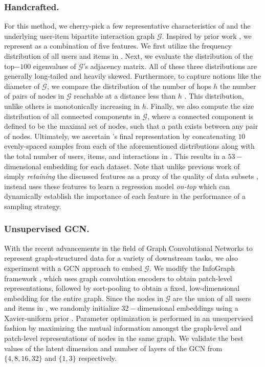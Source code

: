 \subsubsection{Handcrafted. \ \ } For this method, we cherry-pick a few representative characteristics of \dataset and the underlying user-item bipartite interaction graph $\mathcal{G}$. Inspired by prior work \cite{large_graphs}, we represent \dataset as a combination of five features. We first utilize the frequency distribution of all users and items in \dataset. Next, we evaluate the distribution of the top$-100$ eigenvalues of $\mathcal{G}$'s adjacency matrix. All of these three distributions are generally long-tailed and heavily skewed. Furthermore, to capture notions like the diameter of $\mathcal{G}$, we compare the distribution of the number of hops $h$ \vs the number of pairs of nodes in $\mathcal{G}$ reachable at a distance less than $h$ \cite{hop_plot}. This distribution, unlike others is monotonically increasing in $h$. Finally, we also compute the size distribution of all connected components in $\mathcal{G}$, where a connected component is defined to be the maximal set of nodes, such that a path exists between any pair of nodes. Ultimately, we ascertain \dataset's final representation by concatenating $10$ evenly-spaced samples from each of the aforementioned distributions along with the total number of users, items, and interactions in \dataset. This results in a $53-$dimensional embedding for each dataset. Note that unlike previous work of simply \emph{retaining} the discussed features as a proxy of the quality of data subsets \cite{large_graphs}, \oracle instead uses these features to learn a regression model \emph{on-top} which can dynamically establish the importance of each feature in the performance of a sampling strategy.

\subsubsection{Unsupervised GCN. \ \ } With the recent advancements in the field of Graph Convolutional Networks \cite{original_gcn} to represent graph-structured data for a variety of downstream tasks, we also experiment with a GCN approach to embed $\mathcal{G}$. We modify the InfoGraph framework \cite{infograph}, which uses graph convolution encoders to obtain patch-level representations, followed by sort-pooling \cite{sort_pooling} to obtain a fixed, low-dimensional embedding for the entire graph. Since the nodes in $\mathcal{G}$ are the union of all users and items in \dataset, we randomly initialize $32-$dimensional embeddings using a Xavier-uniform prior \cite{xavier}. Parameter optimization is performed in an unsupervised fashion by maximizing the mutual information \cite{mutual_information} amongst the graph-level and patch-level representations of nodes in the same graph. We validate the best values of the latent dimension and number of layers of the GCN from $\{ 4, 8, 16, 32 \}$ and $\{ 1, 3 \}$ respectively.

